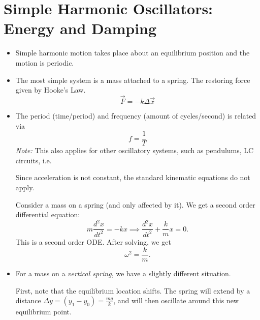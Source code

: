 \section{Simple Harmonic Oscillators: Energy and Damping}
\begin{itemize}
    \item Simple harmonic motion takes place about an equilibrium position and the motion is periodic.
    \item The most simple system is a mass attached to a spring. The restoring force given by Hooke's Law.
          \begin{equation}
              \vec{F} = -k\Delta\vec{x}
          \end{equation}
    \item The period (time/period) and frequency (amount of cycles/second) is related via
          \begin{equation}
              f = \frac{1}{T}
          \end{equation}
          \textit{Note:} This also applies for other oscillatory systems, such as pendulums, LC circuits, i.e.
          \begin{warning}
              Since acceleration is not constant, the standard kinematic equations do not apply.
          \end{warning}
          \begin{example}
              Consider a mass on a spring (and only affected by it). We get a second order differential equation:
              \begin{equation}
                  m\frac{d^2x}{dt^2}=-kx \implies \frac{d^2x}{dt^2}+\frac{k}{m}x = 0.
              \end{equation}
              This is a second order ODE. After solving, we get
              \begin{equation}
                  \omega^2 = \frac{k}{m}.
              \end{equation}
          \end{example}
    \item For a mass on a \textit{vertical spring}, we have a slightly different situation.

          First, note that the equilibrium location shifts. The spring will extend by a distance $\Delta y = (y_1-y_0) = \frac{mg}{k}$, and will then oscillate around this new equilibrium point.


\end{itemize}

